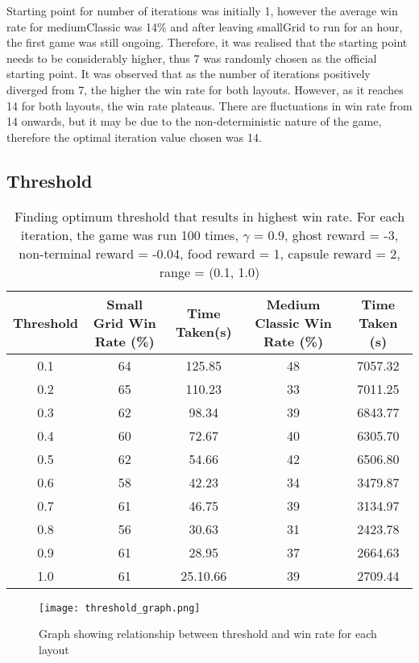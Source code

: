 \documentclass[12pt]{report}
\begin{document}
          Starting point for number of iterations was initially 1, however the average win rate for mediumClassic was 14\% and after leaving smallGrid to run for an hour, the first game was still ongoing. Therefore, it was realised that the starting point needs to be considerably higher, thus 7 was randomly chosen as the official starting point. It was observed that as the number of iterations positively diverged from 7, the higher the win rate for both layouts. However, as it reaches 14 for both layouts, the win rate plateaus. There are fluctuations in win rate from 14 onwards, but it may be due to the non-deterministic nature of the game, therefore the optimal iteration value chosen was 14.

      \subsection*{Threshold}
        \begin{table}[H]
          \begin{center}
            \begin{adjustbox}{max width=\textwidth}
            \begin{tabular}{*{5}{c}}
              \textbf{Threshold} & \textbf{Small Grid Win Rate (\%)} & \textbf{Time Taken(s)} & \textbf{Medium Classic Win Rate (\%)} & \textbf{Time Taken (s)}\\
              \hline
              0.1 & 64 & 125.85 & 48 & 7057.32\\
              0.2 & 65 & 110.23 & 33 & 7011.25\\
              0.3 & 62 & 98.34 & 39 & 6843.77\\
              0.4 & 60 & 72.67 & 40 & 6305.70\\
              0.5 & 62 & 54.66 & 42 & 6506.80\\
              0.6 & 58 & 42.23 & 34 & 3479.87\\
              0.7 & 61 & 46.75 & 39 & 3134.97\\
              0.8 & 56 & 30.63 & 31 & 2423.78\\
              0.9 & 61 & 28.95 & 37 & 2664.63\\
              1.0 & 61 & 25.10.66 & 39 & 2709.44\\
            \end{tabular}
            \end{adjustbox}
            \caption{Finding optimum threshold that results in highest win rate. For each iteration, the game was run 100 times, $\gamma$ = 0.9, ghost reward = -3, non-terminal reward = -0.04, food reward = 1, capsule reward = 2, range = (0.1, 1.0)}
            \label{tab:table3}
          \end{center}
        \end{table}
        \vspace{-13mm}
        \begin{figure}[H]
          \centering
          \texttt{[image: threshold\_graph.png]}
          \caption{Graph showing relationship between threshold and win rate for each layout}
        \end{figure}
\end{document}
